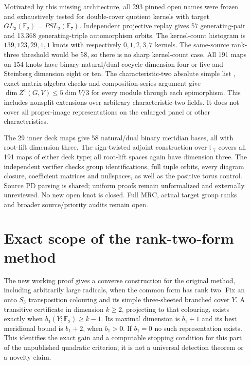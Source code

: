 \documentclass[11pt]{article}
\newcommand{\F}{\mathbb F}
\begin{document}
Motivated by this missing architecture, all 293 pinned open names
were frozen and exhaustively tested for double-cover quotient
kernels with target $GL_3(\F_2)=PSL_2(\F_7)$. Independent projective
replay gives 57 generating-pair and 13,368 generating-triple
automorphism orbits. The kernel-count histogram is
$139,123,29,1,1$ knots with respectively $0,1,2,3,7$ kernels.
The same-source rank-three threshold would be 58, so there is no
sharp kernel-count case. All 191 maps on 154 knots have binary
natural/dual cocycle dimension four or five and Steinberg dimension
eight or ten. The characteristic-two absolute simple list
\cite{atlasgl}, exact matrix-algebra checks and composition-series
argument give $\dim Z^1(G,V)\le5\dim V/3$ for every module through
each epimorphism. This includes nonsplit extensions over arbitrary
characteristic-two fields. It does not cover all proper-image
representations on the enlarged panel or other characteristics.

The 29 inner deck maps give 58 natural/dual binary meridian bases,
all with root-lift dimension three. The sign-twisted adjoint
construction over $\F_7$ covers all 191 maps of either deck type;
all root-lift spaces again have dimension three. The independent
verifier checks group identifications, full tuple orbits, every
diagram closure, coefficient matrices and nullspaces, as well as
the positive torus control. Source PD parsing is shared; uniform
proofs remain unformalized and externally unreviewed. No new open
knot is closed. Full MRC, actual target group ranks and broader
source/priority audits remain open.

\section{Exact scope of the rank-two-form method}

The new working proof 
gives a converse construction for the original method, including
arbitrarily large radicals, when the common form has rank two.
Fix an onto $S_3$ transposition colouring and its simple
three-sheeted branched cover $Y$. A transitive certificate in
dimension $k\ge2$, projecting to that colouring, exists exactly
when $b_1(Y;\F_2)\ge k-1$. Its maximal dimension is $b_1+1$ and
its best meridional bound is $b_1+2$, when $b_1>0$. If $b_1=0$
no such representation exists. This identifies the exact gain
and a computable stopping condition for this part of the
unpublished quadratic criterion; it is not a universal detection
theorem or a novelty claim.
\end{document}
